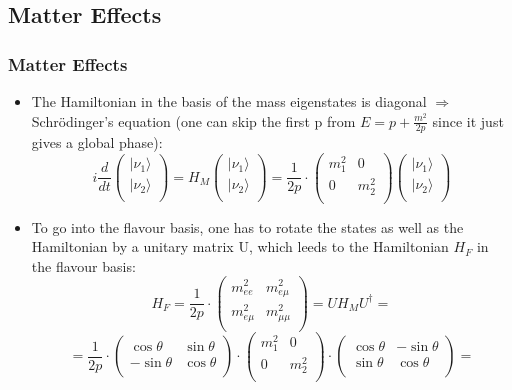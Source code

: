 \documentclass{beamer}
\begin{document}
\subsection{Matter Effects}

\begin{frame}
  \frametitle{Matter Effects}

  \begin{itemize}
 	\item The Hamiltonian in the basis of the mass eigenstates is diagonal $\Rightarrow$ Schr\"odinger's equation (one can skip the first p from $E=p+\frac{m^2}{2p}$ since it just gives a global phase): 
$$
i\frac{d}{dt}
\left(\begin{array}{c}
| \nu_{1} \rangle \\
| \nu_{2} \rangle \\
\end{array}\right)=
H_{M}
\left(\begin{array}{c}
| \nu_{1} \rangle \\
| \nu_{2} \rangle \\
\end{array}\right)=
\frac{1}{2p}\cdot
\left(\begin{array}{cc}
m_1^2 & 0\\
0 & m_2^2\\
\end{array}\right)
\left(\begin{array}{c}
| \nu_{1} \rangle \\
| \nu_{2} \rangle \\
\end{array}\right)$$

	\item To go into the flavour basis, one has to rotate the states as well as the Hamiltonian by a unitary matrix U, which leeds to the Hamiltonian $H_{F}$ in the flavour basis:
$$
H_{F}=
\frac{1}{2p}\cdot
\left(\begin{array}{cc}
m_{ee}^2 & m_{e \mu}^2\\
m_{e \mu}^2 & m_{\mu \mu}^2\\
\end{array}\right)=
U H_{M} U^{\dagger}=
$$
$$
=\frac{1}{2p} \cdot
\left(\begin{array}{cc}
\cos \theta & \sin \theta\\
-\sin \theta & \cos \theta\\
\end{array}\right)
\cdot
\left(\begin{array}{cc}
m_1^2 & 0\\
0 & m_2^2\\
\end{array}\right)
\cdot
\left(\begin{array}{cc}
\cos \theta & -\sin \theta\\
\sin \theta & \cos \theta\\
\end{array}\right)=
$$

 
  \end{itemize}
\end{frame}
\end{document}
